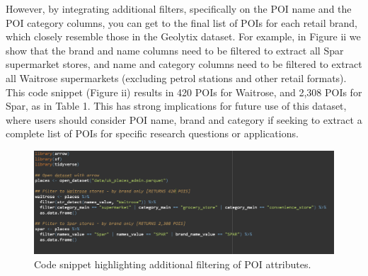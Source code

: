 \documentclass[
]{article}
\begin{document}
However, by integrating additional filters, specifically on the POI name
and the POI category columns, you can get to the final list of POIs for
each retail brand, which closely resemble those in the Geolytix dataset.
For example, in Figure ii we show that the brand and name columns need
to be filtered to extract all Spar supermarket stores, and name and
category columns need to be filtered to extract all Waitrose
supermarkets (excluding petrol stations and other retail formats). This
code snippet (Figure ii) results in 420 POIs for Waitrose, and 2,308
POIs for Spar, as in Table 1. This has strong implications for future
use of this dataset, where users should consider POI name, brand and
category if seeking to extract a complete list of POIs for specific
research questions or applications.

\begin{figure}[H]

{\centering \includegraphics{./figures/figure3.png}

}

\caption{Code snippet highlighting additional filtering of POI
attributes.}

\end{figure}%
\end{document}
